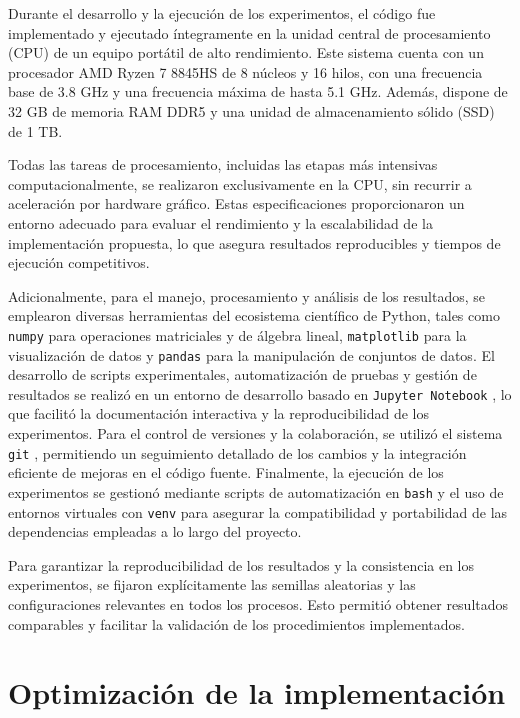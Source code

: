 Durante el desarrollo y la ejecución de los experimentos, el código fue implementado y ejecutado íntegramente en la unidad central de procesamiento (CPU) de un equipo portátil de alto rendimiento. Este sistema cuenta con un procesador AMD Ryzen 7 8845HS de 8 núcleos y 16 hilos, con una frecuencia base de 3.8 GHz y una frecuencia máxima de hasta 5.1 GHz. Además, dispone de 32 GB de memoria RAM DDR5 y una unidad de almacenamiento sólido (SSD) de 1 TB.

Todas las tareas de procesamiento, incluidas las etapas más intensivas computacionalmente, se realizaron exclusivamente en la CPU, sin recurrir a aceleración por hardware gráfico. Estas especificaciones proporcionaron un entorno adecuado para evaluar el rendimiento y la escalabilidad de la implementación propuesta, lo que asegura resultados reproducibles y tiempos de ejecución competitivos.

Adicionalmente, para el manejo, procesamiento y análisis de los resultados, se emplearon diversas herramientas del ecosistema científico de Python, tales como \texttt{numpy} \cite{harris2020array} para operaciones matriciales y de álgebra lineal, \texttt{matplotlib} \cite{matplotlib} para la visualización de datos y \texttt{pandas} \cite{pandas} para la manipulación de conjuntos de datos. El desarrollo de scripts experimentales, automatización de pruebas y gestión de resultados se realizó en un entorno de desarrollo basado en \texttt{Jupyter Notebook} \cite{jupyter}, lo que facilitó la documentación interactiva y la reproducibilidad de los experimentos. Para el control de versiones y la colaboración, se utilizó el sistema \texttt{git} \cite{git}, permitiendo un seguimiento detallado de los cambios y la integración eficiente de mejoras en el código fuente. Finalmente, la ejecución de los experimentos se gestionó mediante scripts de automatización en \texttt{bash} y el uso de entornos virtuales con \texttt{venv} \cite{pythonvenv} para asegurar la compatibilidad y portabilidad de las dependencias empleadas a lo largo del proyecto.

Para garantizar la reproducibilidad de los resultados y la consistencia en los experimentos, se fijaron explícitamente las semillas aleatorias y las configuraciones relevantes en todos los procesos. Esto permitió obtener resultados comparables y facilitar la validación de los procedimientos implementados.

\section{Optimización de la implementación}\label{section:optimization}

